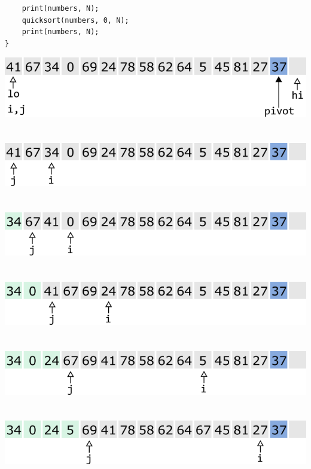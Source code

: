 \documentclass{article}
\begin{document}
\begin{multicols}{2}
\begin{lstlisting}
    print(numbers, N);
    quicksort(numbers, 0, N);
    print(numbers, N);
}
\end{lstlisting}
\vfill\null
\columnbreak
\includegraphics[scale=0.53]{../images/qs2.png}
\\
\\
\\
\includegraphics[scale=0.53]{../images/qs4.png}
\\
\\
\\
\includegraphics[scale=0.53]{../images/qs5.png}
\\
\\
\\
\includegraphics[scale=0.53]{../images/qs6.png}
\\
\\
\\
\includegraphics[scale=0.53]{../images/qs7.png}
\\
\\
\\
\includegraphics[scale=0.53]{../images/qs8.png}

\end{multicols}
\end{document}
